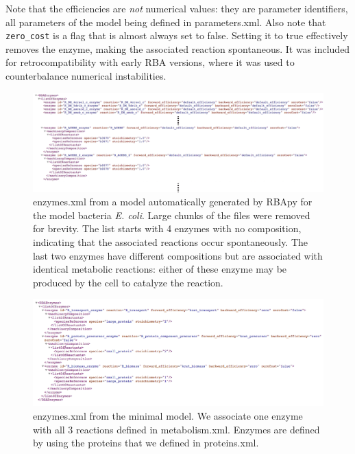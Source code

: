 Note that the efficiencies are \emph{not} numerical values:
they are parameter identifiers, all parameters of the model being defined in parameters.xml.
Also note that \texttt{zero\_cost} is a flag that is almost always set to false.
Setting it to true effectively removes the enzyme, making the associated reaction
spontaneous.
It was included for retrocompatibility with early RBA versions, where it was
used to counterbalance numerical instabilities.



\begin{figure}
  \centering
  \includegraphics[scale=0.4]{figures/enzymes_ex_1}
  \caption{enzymes.xml from a model automatically generated by RBApy for the
  model bacteria \textit{E. coli}.
  Large chunks of the files were removed for brevity.
  The list starts with 4 enzymes with no composition, indicating that
  the associated reactions occur spontaneously.
  The last two enzymes have different compositions but are associated with
  identical metabolic reactions:
  either of these enzyme may be produced by the cell to catalyze the reaction.}
  \label{fig:enzymes_ex_1}
\end{figure}

\begin{figure}
  \centering
  \includegraphics[scale=0.4]{figures/enzymes_ex_2}
  \caption{enzymes.xml from the minimal model.
  We associate one enzyme with all 3 reactions defined in metabolism.xml.
  Enzymes are defined by using the proteins that we defined in proteins.xml.}
  \label{fig:enzymes_ex_2}
\end{figure}
